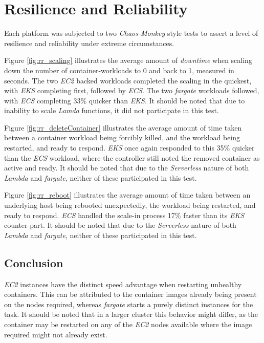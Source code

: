\section{Resilience and Reliability}
Each platform was subjected to two \textit{Chaos-Monkey} style tests to assert a level of resilience and reliability under extreme circumstances.

Figure \ref{fig:rr_scaling} illustrates the average amount of \textit{downtime} when scaling down the number of container-workloads to 0 and back to 1, measured in seconds.
The two \textit{EC2} backed workloads completed the scaling in the quickest, with \textit{EKS} completing first, followed by \textit{ECS}.
The two \textit{fargate} workloads followed, with \textit{ECS} completing 33\% quicker than \textit{EKS}.
It should be noted that due to inability to scale \textit{Lamda} functions, it did not participate in this test.

Figure \ref{fig:rr_deleteContainer} illustrates the average amount of time taken between a container workload being forcibly killed, and the workload being restarted, and ready to respond.
\textit{EKS} once again responded to this 35\% quicker than the \textit{ECS} workload, where the controller still noted the removed container as active and ready.
It should be noted that due to the \textit{Serverless} nature of both \textit{Lambda} and \textit{fargate}, neither of these participated in this test.

Figure \ref{fig:rr_reboot} illustrates the average amount of time taken between an underlying host being rebooted unexpectedly, the workload being restarted, and ready to respond.
\textit{ECS} handled the scale-in process 17\% faster than its \textit{EKS} counter-part.
It should be noted that due to the \textit{Serverless} nature of both \textit{Lambda} and \textit{fargate}, neither of these participated in this test.

\subsection*{Conclusion}
\textit{EC2} instances have the distinct speed advantage when restarting unhealthy containers.
This can be attributed to the container images already being present on the nodes required, whereas \textit{fargate} starts a purely distinct instances for the task.
It should be noted that in a larger cluster this behavior might differ, as the container may be restarted on any of the \textit{EC2} nodes available where the image required might not already exist.

